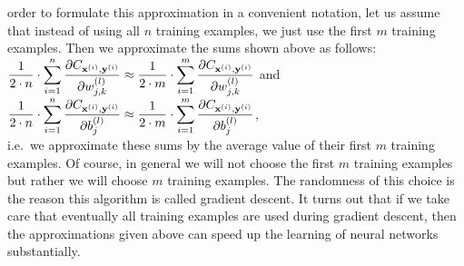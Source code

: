 order to formulate this approximation in a convenient notation, let us assume that instead of using all $n$
training examples, we just use the first $m$ training examples.  Then we approximate the sums shown above as follows:
\\[0.2cm]
\hspace*{1.3cm}
$\displaystyle \frac{1}{2\cdot n} \cdot \sum\limits_{i=1}^n \frac{\partial C_{\mathbf{x}^{(i)}, \mathbf{y}^{(i)}}}{\partial w_{j,k}^{(l)}}
 \approx
 \frac{1}{2\cdot m} \cdot \sum\limits_{i=1}^m \frac{\partial C_{\mathbf{x}^{(i)}, \mathbf{y}^{(i)}}}{\partial w_{j,k}^{(l)}}
$
\quad and \quad
$\displaystyle \frac{1}{2\cdot n} \cdot \sum\limits_{i=1}^n \frac{\partial C_{\mathbf{x}^{(i)}, \mathbf{y}^{(i)}}}{\partial b_{j}^{(l)}}
     \approx
     \frac{1}{2\cdot m} \cdot \sum\limits_{i=1}^m \frac{\partial C_{\mathbf{x}^{(i)}, \mathbf{y}^{(i)}}}{\partial b_{j}^{(l)}}
$,
\\[0.2cm]
i.e.~we approximate these sums by the average value of their first $m$ training examples.
Of course, in general we will not choose the first $m$ training examples but rather we will choose $m$ 
training examples.  The randomness of this choice is the reason this algorithm is called 
gradient descent.  It turns out that if we take care that eventually all training examples are used during
gradient descent, then the approximations given above can speed up the learning of neural networks substantially.

